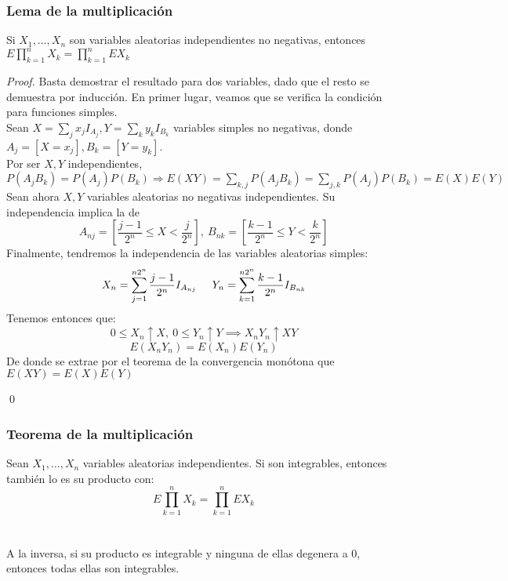 \subsubsection{Lema de la multiplicación}
\begin{lemma}
Si $X_1, \ldots , X_n$ son variables aleatorias independientes no negativas, entonces $E\displaystyle\prod_{k=1}^{n}X_k=\displaystyle\prod_{k=1}^{n} E X_k$
\end{lemma}
\begin{proof}
Basta demostrar el resultado para dos variables, dado que el resto se demuestra por inducción. En primer lugar, veamos que se verifica la condición para funciones simples.\\

Sean $X = \sum_j x_j I_{A_j}, Y = \sum_k y_k I_{B_k}$ variables simples no negativas, donde $A_j = [X = x_j], B_k = [Y = y_k]$.\\

Por ser $X,Y$ independientes, $P(A_jB_k) = P(A_j)P(B_k) \Rightarrow E(XY) = \sum_{k,j} P(A_jB_k) = \sum_{j,k} P(A_j)P(B_k) = E(X)E(Y)$\\

Sean ahora $X,Y$ variables aleatorias no negativas independientes. 
Su independencia implica la de
$$ A_{nj} = \left[\frac{j-1}{2^n} \leq X < \frac{j}{2^n}\right],\  B_{nk} = \left[\frac{k-1}{2^n} \leq Y < \frac{k}{2^n}\right]$$
Finalmente, tendremos la independencia de las variables aleatorias simples:
$$ X_n = \sum_{j=1}^{n2^n} \frac {j-1}{2^n}I_{A_{nj}}\hspace{0.5cm} Y_n = \sum_{k=1}^{n2^n} \frac {k-1}{2^n}I_{B_{nk}}$$
Tenemos entonces que:
$$ 0 \leq X_n \uparrow X, \ 0 \leq Y_n \uparrow Y \implies X_nY_n \uparrow XY$$
$$ E(X_nY_n) = E(X_n)E(Y_n)$$
De donde se extrae por el teorema de la convergencia monótona que $E(XY) = E(X)E(Y)$

\qed
\end{proof}

\subsubsection{Teorema de la multiplicación}
\begin{theorem}
Sean $X_1,\ldots, X_n$ variables aleatorias independientes. Si son integrables, entonces también lo es su producto con: $$E\displaystyle\prod_{k=1}^n X_k=\displaystyle\prod_{k=1}^n E X_k$$
\\\\
A la inversa, si su producto es integrable y ninguna de ellas degenera a $0$, entonces todas ellas son integrables.
\end{theorem}

